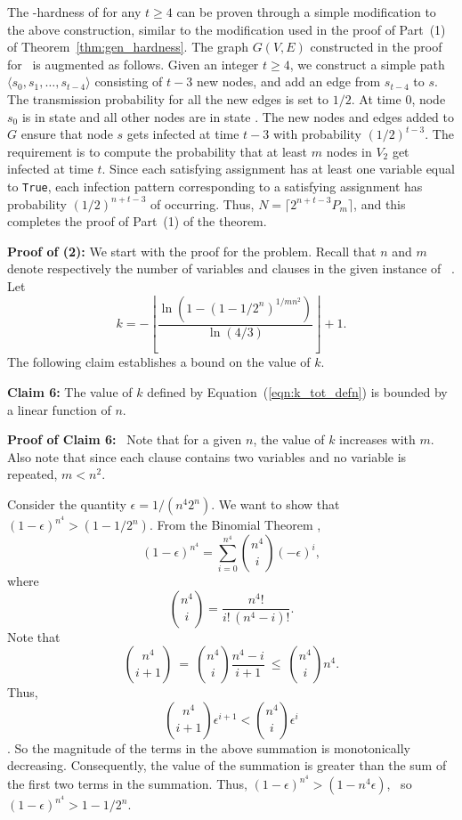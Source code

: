 The \cnump-hardness of \tNewInfv{} for any $t \geq 4$ can be 
proven through a simple modification to the above construction,
similar to the modification used in the proof of Part~(1)
of Theorem~\ref{thm:gen_hardness}.
The graph $G(V,E)$ constructed in the proof for \ThrNewInfv{} ~is
augmented as follows.
Given an integer $t \geq 4$, we construct a simple path 
$\langle s_0, s_1, \ldots, s_{t-4}\rangle$
consisting of $t-3$ new nodes, and add an edge from $s_{t-4}$ to $s$.
The transmission probability for all the new edges is set to $1/2$.
At time 0, node $s_0$ is in state \istate{} and all 
other nodes are in state \sstate. 
The new nodes and edges added to $G$ ensure that 
node $s$ gets infected at time $t-3$ with probability $(1/2)^{t-3}$.
The requirement is to compute the probability that at least $m$
nodes in $V_2$ get infected at time $t$.  
Since each satisfying assignment has at least one variable equal to 
\texttt{True},
each infection pattern 
corresponding to a satisfying assignment has probability 
$(1/2)^{n+t-3}$ of occurring.
Thus, $N = \displaystyle{\lceil 2^{n+t-3} P_m \rceil}$, and
this completes the proof of Part~(1) of the theorem.



\medskip
\noindent
\textbf{Proof of (2):}
We start with the proof for the \TwoTotInfv{} problem.
Recall that $n$ and $m$ denote respectively the number of variables and
clauses in the given instance of~ \mtsat.
Let
\begin{equation}\label{eqn:k_tot_defn}
k = - \left\lfloor \frac{\ln (1- (1-1/2^n)^{1/{m n^2}} )}{\ln(4/3)} 
        \right\rfloor + 1.
\end{equation}
The following claim establishes a bound on the value of $k$.

\medskip
\noindent
\textbf{Claim 6:} The value of
$k$ defined by Equation~(\ref{eqn:k_tot_defn})
is bounded by a linear function of $n$.

\medskip
\noindent
\textbf{Proof of Claim 6:}~
Note that for a given $n$, the value of $k$ increases with $m$.
Also note that since each clause contains two variables and no
variable is repeated, $m < n^2$.

Consider the quantity $\epsilon = 1/(n^4 2^n)$.
We want to show that $(1 - \epsilon)^{n^4} > (1-1/2^n)$.
From the Binomial Theorem \cite{Rosen-2011},
$$(1 - \epsilon)^{n^4} = \sum_{i=0}^{n^4} {n^4 \choose i}{(- \epsilon)}^i,$$
where 
$${n^4 \choose i} = \frac{n^4!}{i! \, (n^4-i)!}.$$
Note that 
$${n^4 \choose i+1} ~=~ 
{n^4 \choose i} \frac{n^4-i}{i+1} ~\leq~ {n^4 \choose i} n^4.$$
Thus,
$${n^4 \choose i+1} {\epsilon}^{i+1} < {n^4 \choose i} {\epsilon}^i$$.
So the magnitude of the terms in the above summation is 
monotonically decreasing.
Consequently, the value of the summation is greater than 
the sum of the first two terms in the summation.
Thus, $(1 - \epsilon)^{n^4} > (1 - n^4 \epsilon)$,~ 
so  $(1 - \epsilon)^{n^4} > 1-1/2^n$.

